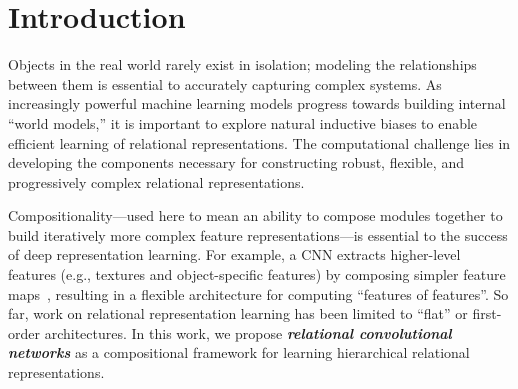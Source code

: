 \section{Introduction}\label{sec:intro}

Objects in the real world rarely exist in isolation; 
modeling the relationships between them is essential to accurately capturing complex systems. As increasingly powerful machine learning models progress towards building internal ``world models,'' it is important to explore natural inductive biases to enable efficient learning of relational representations. The computational challenge lies in developing the components necessary for constructing robust, flexible, and progressively complex relational representations.

Compositionality---used here to mean an ability to compose modules together to build iteratively more complex feature representations---is essential to the success of deep representation learning. 
For example, a CNN extracts higher-level features (e.g., textures and object-specific features) by composing simpler feature maps~\citep{zeiler2014visualizing}, resulting in a flexible architecture for computing ``features of features''. So far, work on relational representation learning has been limited to ``flat'' or first-order architectures. In this work, we propose \textit{\bfseries relational convolutional networks} as a compositional framework for learning hierarchical relational representations.


